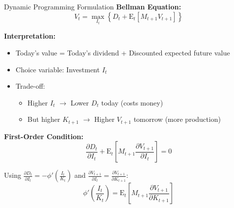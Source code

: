 \documentclass{beamer}
\begin{document}
\begin{frame}{Dynamic Programming Formulation}
    \textbf{Bellman Equation:}
    \begin{equation}\label{equ:bellman}
        V_t = \max_{I_t} \left\{ D_t + \mathrm{E}_t\left[M_{t+1} V_{t+1}\right] \right\}
    \end{equation}
    
    \textbf{Interpretation:}
    \begin{itemize}
        \item Today's value = Today's dividend + Discounted expected future value
        \item Choice variable: Investment $I_t$
        \item Trade-off:
        \begin{itemize}
            \item Higher $I_t$ $\rightarrow$ Lower $D_t$ today (costs money)
            \item But higher $K_{t+1}$ $\rightarrow$ Higher $V_{t+1}$ tomorrow (more production)
        \end{itemize}
    \end{itemize}
    
    
    \textbf{First-Order Condition:}
    \begin{equation}\label{equ:foc}
        \frac{\partial D_t}{\partial I_t} + \mathrm{E}_t\left[M_{t+1} \frac{\partial V_{t+1}}{\partial I_t}\right] = 0
    \end{equation}
    
    Using $\frac{\partial D_t}{\partial I_t} = -\phi'\left(\frac{I_t}{K_t}\right)$ and $\frac{\partial V_{t+1}}{\partial I_t} = \frac{\partial V_{t+1}}{\partial K_{t+1}}$:
    \begin{equation}\label{equ:marginal}
        \phi'\left(\frac{I_t}{K_t}\right) = \mathrm{E}_t\left[M_{t+1} \frac{\partial V_{t+1}}{\partial K_{t+1}}\right]
    \end{equation}
\end{frame}
\end{document}
